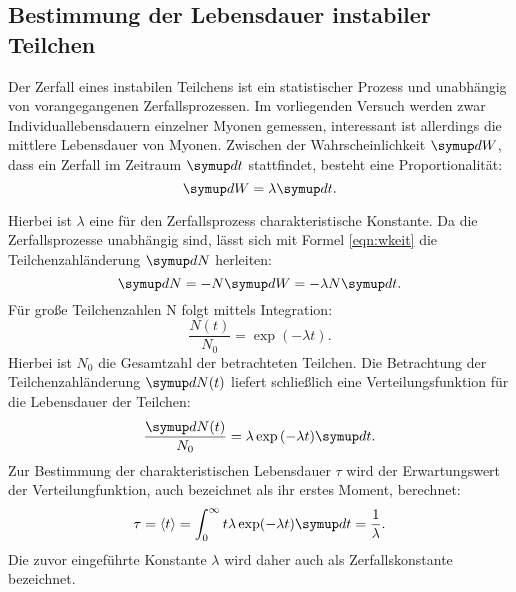 \subsection{Bestimmung der Lebensdauer instabiler Teilchen}
Der Zerfall eines instabilen Teilchens ist ein statistischer Prozess und unabhängig von vorangegangenen Zerfallsprozessen.
Im vorliegenden Versuch werden zwar Individuallebensdauern einzelner Myonen gemessen, interessant ist allerdings die mittlere Lebensdauer von Myonen.
Zwischen der Wahrscheinlichkeit $\upd W$, dass ein Zerfall im Zeitraum $\upd t$ stattfindet, besteht eine Proportionalität:
\begin{equation}
  \label{eqn:wkeit}
  \upd W=\lambda\upd t\mathrm{.}
\end{equation}

Hierbei ist $\lambda$ eine für den Zerfallsprozess charakteristische Konstante.
Da die Zerfallsprozesse unabhängig sind, lässt sich mit Formel \ref{eqn:wkeit} die Teilchenzahländerung $\upd N$ herleiten:
\begin{equation*}
\upd N = -N \upd W = - \lambda N \upd t  \mathrm{.}
\end{equation*}
Für große Teilchenzahlen N folgt mittels Integration:
\begin{equation}
\frac{N(t)}{N_0} = \exp{(-\lambda t)}\mathrm{.}
\end{equation}
Hierbei ist $N_0$ die Gesamtzahl der betrachteten Teilchen.
Die Betrachtung der Teilchenzahländerung $\upd N(t)$ liefert schließlich eine Verteilungsfunktion für die Lebensdauer der Teilchen:
\begin{equation}
  \label{eqn:verteilung}
  \frac{\upd N(t)}{N_0} = \lambda \exp{(-\lambda t)}\upd t\mathrm{.}
\end{equation}
Zur Bestimmung der charakteristischen Lebensdauer $\tau$ wird der Erwartungswert der Verteilungfunktion, auch bezeichnet als ihr erstes Moment, berechnet:
\begin{equation}
  \tau=\Braket{t}=\int_0^\infty t\lambda\exp(-\lambda t)\upd t=\frac{1}{\lambda}\mathrm{.}
\end{equation}
Die zuvor eingeführte Konstante $\lambda$ wird daher auch als Zerfallskonstante bezeichnet.


